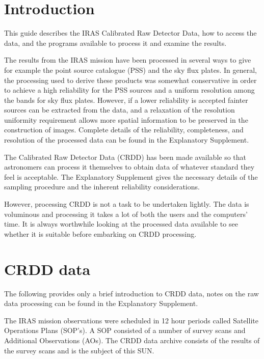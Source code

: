 \documentclass[nolof,noabs,11pt]{starlink}
\begin{document}
\scfrontmatter

\section {Introduction}

This guide describes the IRAS Calibrated Raw Detector Data, how to access the
data, and the programs available to process it and examine the results.

The results from the IRAS mission have been processed in several ways to give
for example the point source catalogue (PSS) and the sky flux plates. In
general, the processing used to derive these products was somewhat conservative
in order to achieve a high reliability for the PSS sources and a uniform
resolution among the bands for sky flux plates. However, if a lower reliability
is accepted fainter sources can be extracted from the data, and a relaxation of
the resolution uniformity requirement allows more spatial information to be
preserved in the construction of images.
Complete details of the reliability, completeness, and resolution of the
processed data can be found in the Explanatory Supplement.

The Calibrated Raw Detector Data (CRDD) has been made available so that
astronomers can process it themselves to obtain data of whatever standard
they feel is acceptable. The Explanatory Supplement gives the necessary details
of the sampling procedure and the inherent reliability considerations.

However, processing CRDD is not a task to be undertaken lightly. The data is
voluminous and processing it takes a lot of both the users and the computers'
time. It is always worthwhile looking at the processed data available to see
whether it is suitable before embarking on CRDD processing.

\section{CRDD data}

The following provides only a brief introduction to CRDD data, notes on the raw
data processing can be found in the Explanatory Supplement.

The IRAS mission observations were scheduled in 12 hour periods called
Satellite Operations Plans (SOP's). A SOP consisted of a number of survey scans
and Additional Observations (AOs). The CRDD data archive consists of the
results of the survey scans and is the subject of this SUN.
\end{document}
